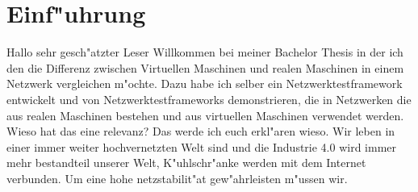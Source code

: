 \chapter{Einf"uhrung}
\label{cha:einfuehrung}

Hallo sehr gesch"atzter Leser Willkommen bei meiner Bachelor Thesis in %
 der ich den die Differenz zwischen Virtuellen Maschinen und realen Maschinen %
 in einem Netzwerk vergleichen m"ochte. Dazu habe ich selber ein Netzwerktestframework %
 entwickelt und 
 von Netzwerktestframeworks demonstrieren, %
 die in Netzwerken die aus realen Maschinen bestehen und aus virtuellen %
 Maschinen verwendet werden. Wieso hat das eine relevanz? Das werde ich euch %
 erkl"aren wieso. Wir leben in einer immer weiter hochvernetzten Welt sind %
 und die Industrie 4.0 wird immer mehr bestandteil unserer Welt, K"uhlschr"anke %
 werden mit dem Internet verbunden. Um eine hohe netzstabilit"at %
 gew"ahrleisten m"ussen wir.

\newpage
